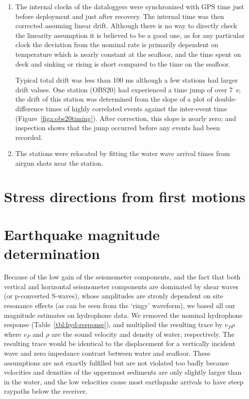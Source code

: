 \documentclass[reviewcopy]{elsarticle}
\begin{document}
\begin{enumerate}
\item
The internal clocks of the dataloggers were synchronized with GPS time
just before deployment and just after recovery. The internal time was
then corrected assuming linear drift.  Although there is no way to
directly check the linearity assumption it is believed to be a good
one, as for any particular clock the deviation from the nominal rate
is primarily dependent on temperature which is nearly constant at the
seafloor, and the time spent on deck and sinking or rising is short
compared to the time on the seafloor.

 Typical total drift was less than
100 ms although a few stations had larger drift values.  One station
(OBS20) had experienced a time jump of over 7~s;
the drift of this
station was determined from the slope of a plot of double-difference
times of highly correlated events against the inter-event time
(Figure~\ref{figa:obs20timing}).  After correction, this slope is
nearly zero; and inspection shows that the jump occurred before any
events had been recorded.

\item The stations were relocated by fitting the water wave arrival
times from airgun shots near the station. 
\end{enumerate}

\section{Stress directions from first motions}

\section{Earthquake magnitude determination}
\label{sec:magnitude}

Because of the low gain of the seismometer components, and the fact
that both vertical and horizontal seismometer components are dominated
by shear waves (or p-converted S-waves), whose amplitudes are stronly
dependent on site resonance effects (as can be seen from the `ringy'
waveform), we based all our magnitude estimates on hydrophone data.
We removed the nominal hydrophone response
(Table~\ref{tbl:hyd-response}), and multiplied the resulting trace by
$v_P \rho$ where $v_P$ and $\rho$ are the sound velocity and density
of water, respectively. The resulting trace would be identical to the
displacement for a vertically incident wave and zero impedance contrast
between water and seafloor.  These assumptions are not exactly
fulfilled but are not violated too badly because velocities and
densities of the uppermost sediments are only slightly larger than in
the water, and the low velocities cause most earthquake arrivals to
have steep raypaths below the receiver.
\end{document}
